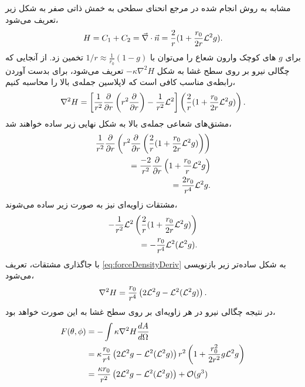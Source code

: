 مشابه به روش انجام شده در مرجع 
\cite{milnersafranPRA1987}
انحنای سطحی به خمش ذاتی صفر به شکل زیر تعریف می‌شود،
\begin{equation}
H= C_1+C_2=\vec\nabla\cdot\vec n=\frac{2}{r}(1+\frac{r_0}{2r}{\cal L}^2g).
\end{equation}
برای 
$g$
های کوچک وارون شعاع را می‌توان با 
$1/r\approx\frac{1}{r_0}(1-g)$
تخمین زد. از آنجایی که چگالی نیرو بر روی سطح غشا به شکل 
$-\kappa\nabla^2H$
تعریف می‌شود، برای بدست آوردن رابطه‌ی مناسب کافی است که لاپلاسین جمله‌ی بالا را محاسبه کنیم،
\begin{equation}
\begin{aligned}
\nabla^2H=\left[\frac{1}{r^2}\frac{\partial}{\partial r}\left(r^2\frac{\partial}{\partial r}\right)-\frac{1}{r^2}{\cal L}^2\right]\left(\frac{2}{r}(1+\frac{r_0}{2r}{\cal L}^2g)\right).
\label{eq:forceDensityDeriv}
\end{aligned}
\end{equation}
مشتق‌های شعاعی جمله‌ی بالا به شکل نهایی زیر ساده خواهند شد،
\begin{equation}
\begin{aligned}
\frac{1}{r^2}\frac{\partial}{\partial r}\left(r^2\frac{\partial}{\partial r}\left(\frac{2}{r}(1+\frac{r_0}{2r}{\cal L}^2g)\right)\right)\\
=\frac{-2}{r^2}\frac{\partial}{\partial r}\left(1+\frac{r_0}{r}{\cal L}^2g\right)\\
=\frac{2r_0}{r^4}{\cal L}^2g.
\end{aligned}
\end{equation}
مشتقات زاویه‌ای نیز به صورت زیر ساده می‌شوند،
\begin{equation}
\begin{aligned}
-\frac{1}{r^2}{\cal L}^2\left(\frac{2}{r}(1+\frac{r_0}{2r}{\cal L}^2g)\right)\\
=-\frac{r_0}{r^4}{\cal L}^2({\cal L}^2g).
\end{aligned}
\end{equation}
با جاگذاری مشتقات، تعریف 
\ref{eq:forceDensityDeriv}
به شکل ساده‌تر زیر بازنویسی می‌شود،
\begin{equation}
\begin{aligned}
\nabla^2H=\frac{r_0}{r^4}\left(2{\cal L}^2g-{\cal L}^2({\cal L}^2g)\right).
\end{aligned}
\end{equation}
در نتیجه چگالی نیرو در هر زاویه‌ای بر روی سطح غشا به این صورت خواهد بود،
\begin{equation}
\begin{aligned}
F(\theta,\phi)&=-\int\kappa\nabla^2H\frac{dA}{d\Omega}\\
&=\kappa\frac{r_0}{r^4}\left(2{\cal L}^2g-{\cal L}^2({\cal L}^2g)\right)r^2\left(1+\frac{r_0^2}{2r^2}g{\cal L}^2g\right)\\
&=\frac{\kappa r_0}{r^2}\left(2{\cal L}^2g-{\cal L}^2({\cal L}^2g)\right) + {\cal O}(g^3)\\
\end{aligned}
\end{equation}
